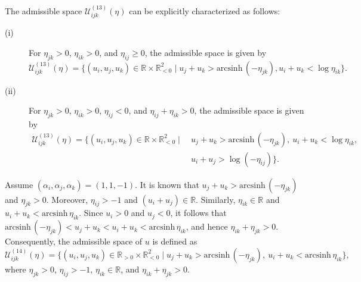 \documentclass[12pt]{amsart}
\theoremstyle{definition}
\begin{document}
\begin{description}
The admissible space $\mathcal{U}^{(13)}_{ijk}(\eta)$ can be explicitly characterized as follows:
\begin{description}
\item[(i)]For $\eta_{jk}>0$, $\eta_{ik}>0$, and $\eta_{ij}\geq0$, the admissible space is given by
\begin{equation*}
\mathcal{U}_{ijk}^{(13)}(\eta)
=\{(u_i,u_j,u_k)\in \mathbb{R}\times\mathbb{R}^2_{<0}
\mid u_j+u_k>\mathrm{arcsinh}\, (-\eta_{jk}),
u_i+u_k<\log \eta_{ik} \}.
\end{equation*}
\item[(ii)] For $\eta_{jk}>0$, $\eta_{ik}>0$, $\eta_{ij}<0$, and $\eta_{ij}+\eta_{ik}>0$, the admissible space is given by
\begin{align*}
\mathcal{U}_{ijk}^{(13)}(\eta)
=\{(u_i,u_j,u_k)\in \mathbb{R}\times\mathbb{R}^2_{<0}
\mid &\ u_j+u_k>\mathrm{arcsinh}\, (-\eta_{jk}),\
u_i+u_k<\log \eta_{ik},\ \\
&\ u_i+u_j>\log(-\eta_{ij}) \}.
\end{align*}
\end{description}

\item[(XIV)]
Assume $(\alpha_i,\alpha_j,\alpha_k)=(1,1,-1)$.
It is known that $u_j+u_k>\mathrm{arcsinh}\, (-\eta_{jk})$ and $\eta_{jk}>0$.
Moreover, $\eta_{ij}> -1$ and $(u_i+u_j)\in \mathbb{R}$.
Similarly, $\eta_{ik}\in \mathbb{R}$ and $u_i+u_k<\mathrm{arcsinh}\, \eta_{ik}$.
Since $u_i>0$ and $u_j<0$, it follows that $\mathrm{arcsinh}\, (-\eta_{jk})<u_j+u_k<u_i+u_k<\mathrm{arcsinh}\, \eta_{ik}$, and hence $\eta_{ik}+\eta_{jk}>0$.
Consequently, the admissible space of $u$ is defined as
\begin{equation*}
\mathcal{U}^{(14)}_{ijk}(\eta)
=\{(u_i,u_j,u_k)\in \mathbb{R}_{>0}\times\mathbb{R}^2_{<0}
\mid u_j+u_k>\mathrm{arcsinh}\, (-\eta_{jk}),\
u_i+u_k<\mathrm{arcsinh}\, \eta_{ik} \},
\end{equation*}
where $\eta_{jk}>0$, $\eta_{ij}>-1$, $\eta_{ik}\in \mathbb{R}$, and $\eta_{ik}+\eta_{jk}>0$.


\end{description}
\end{document}
